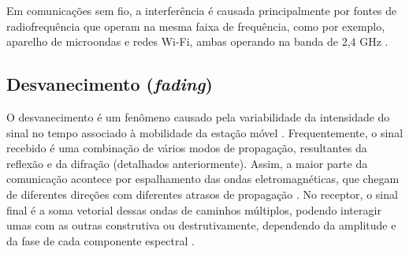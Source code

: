 Em comunicações sem fio, a interferência é causada principalmente por fontes de radiofrequência que operam na mesma faixa de frequência, como por exemplo, aparelho de microondas e redes Wi-Fi, ambas operando na banda de 2,4 GHz \cite{moraes2010}.
\begin{figure}[H]
	\centering
\end{figure}

\subsection{Desvanecimento (\textit{fading})}
\label{sub:desvanecimento}

O desvanecimento é um fenômeno causado pela variabilidade da intensidade do sinal no tempo associado à mobilidade da estação móvel \cite{haykin2008,rappaport2009}. Frequentemente, o sinal recebido é uma combinação de vários modos de propagação, resultantes da reflexão e da difração (detalhados anteriormente). Assim, a maior parte da comunicação acontece por espalhamento das ondas eletromagnéticas, que chegam de diferentes direções com diferentes atrasos de propagação \cite{haykin2008}. No receptor, o sinal final é a soma vetorial dessas ondas de caminhos múltiplos, podendo interagir umas com as outras construtiva ou destrutivamente, dependendo da amplitude e da fase de cada componente espectral \cite{haykin2008}.
\begin{figure}[H]
	\centering
\end{figure}


